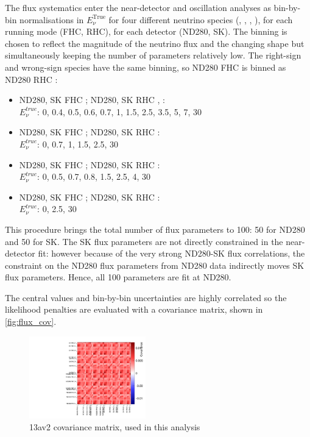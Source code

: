 The flux systematics enter the near-detector and oscillation analyses as bin-by-bin normalisations in $E_\nu^\text{True}$ for four different neutrino species (\numu, \numubar, \nue, \nuebar), for each running mode (FHC, RHC), for each detector (ND280, SK). The binning is chosen to reflect the magnitude of the neutrino flux and the changing shape but simultaneously keeping the number of parameters relatively low. The right-sign and wrong-sign species have the same binning, so ND280 FHC \numu is binned as ND280 RHC \numubar:
\begin{itemize}
	\item ND280, SK FHC \numu; ND280, SK RHC \numubar, :\\
	$E_\nu^{true}$: 0, 0.4, 0.5, 0.6, 0.7, 1, 1.5, 2.5, 3.5, 5, 7, 30
	
	\item ND280, SK FHC \numubar; ND280, SK RHC \numu:\\
	$E_\nu^{true}$: 0, 0.7, 1, 1.5, 2.5, 30
	
	\item ND280, SK FHC \nue; ND280, SK RHC \nuebar:\\
	$E_\nu^{true}$: 0, 0.5, 0.7, 0.8, 1.5, 2.5, 4, 30
	
	\item ND280, SK FHC \nuebar; ND280, SK RHC \nue:\\
	$E_\nu^{true}$: 0, 2.5, 30
\end{itemize}
This procedure brings the total number of flux parameters to 100: 50 for ND280 and 50 for SK. The SK flux parameters are not directly constrained in the near-detector fit: however because of the very strong ND280-SK flux correlations, the constraint on the ND280 flux parameters from ND280 data indirectly moves SK flux parameters. Hence, all 100 parameters are fit at ND280.

The central values and bin-by-bin uncertainties are highly correlated so the likelihood penalties are evaluated with a covariance matrix, shown in \autoref{fig:flux_cov}.
\begin{figure}[h]
	\includegraphics[width=0.45\textwidth, trim={0mm 0mm 0mm 0mm}, clip,page=1]{figures/mach3/inputs/flux_covariance_banff_13av2}
	\caption{13av2 covariance matrix, used in this analysis}
	\label{fig:flux_cov}
\end{figure}


